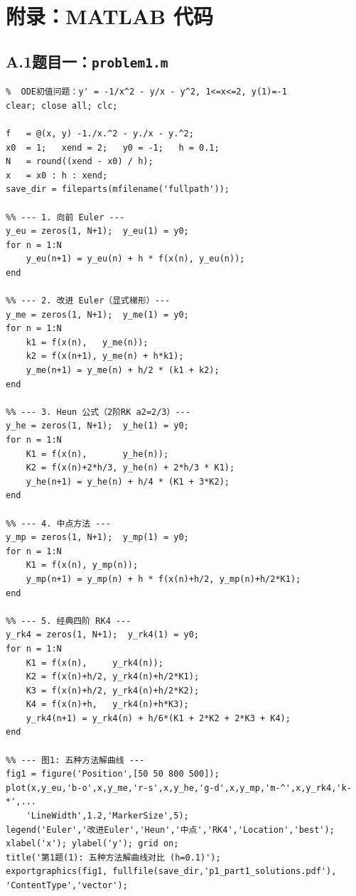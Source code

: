 \documentclass[UTF8,a4paper,11pt]{article}
\begin{document}
\section*{附录：MATLAB 代码}

\subsection*{A.1\quad 题目一：\texttt{problem1.m}}

\begin{lstlisting}[style=matlab, caption={\texttt{problem1.m}：五种单步方法与四阶 Adams PECE}]
%% problem1.m  第五章上机第1题
%  ODE初值问题：y' = -1/x^2 - y/x - y^2, 1<=x<=2, y(1)=-1
clear; close all; clc;

f   = @(x, y) -1./x.^2 - y./x - y.^2;
x0  = 1;   xend = 2;   y0 = -1;   h = 0.1;
N   = round((xend - x0) / h);
x   = x0 : h : xend;
save_dir = fileparts(mfilename('fullpath'));

%% --- 1. 向前 Euler ---
y_eu = zeros(1, N+1);  y_eu(1) = y0;
for n = 1:N
    y_eu(n+1) = y_eu(n) + h * f(x(n), y_eu(n));
end

%% --- 2. 改进 Euler（显式梯形）---
y_me = zeros(1, N+1);  y_me(1) = y0;
for n = 1:N
    k1 = f(x(n),   y_me(n));
    k2 = f(x(n+1), y_me(n) + h*k1);
    y_me(n+1) = y_me(n) + h/2 * (k1 + k2);
end

%% --- 3. Heun 公式（2阶RK a2=2/3）---
y_he = zeros(1, N+1);  y_he(1) = y0;
for n = 1:N
    K1 = f(x(n),       y_he(n));
    K2 = f(x(n)+2*h/3, y_he(n) + 2*h/3 * K1);
    y_he(n+1) = y_he(n) + h/4 * (K1 + 3*K2);
end

%% --- 4. 中点方法 ---
y_mp = zeros(1, N+1);  y_mp(1) = y0;
for n = 1:N
    K1 = f(x(n), y_mp(n));
    y_mp(n+1) = y_mp(n) + h * f(x(n)+h/2, y_mp(n)+h/2*K1);
end

%% --- 5. 经典四阶 RK4 ---
y_rk4 = zeros(1, N+1);  y_rk4(1) = y0;
for n = 1:N
    K1 = f(x(n),     y_rk4(n));
    K2 = f(x(n)+h/2, y_rk4(n)+h/2*K1);
    K3 = f(x(n)+h/2, y_rk4(n)+h/2*K2);
    K4 = f(x(n)+h,   y_rk4(n)+h*K3);
    y_rk4(n+1) = y_rk4(n) + h/6*(K1 + 2*K2 + 2*K3 + K4);
end

%% --- 图1: 五种方法解曲线 ---
fig1 = figure('Position',[50 50 800 500]);
plot(x,y_eu,'b-o',x,y_me,'r-s',x,y_he,'g-d',x,y_mp,'m-^',x,y_rk4,'k-*',...
    'LineWidth',1.2,'MarkerSize',5);
legend('Euler','改进Euler','Heun','中点','RK4','Location','best');
xlabel('x'); ylabel('y'); grid on;
title('第1题(1): 五种方法解曲线对比 (h=0.1)');
exportgraphics(fig1, fullfile(save_dir,'p1_part1_solutions.pdf'), 'ContentType','vector');


\end{lstlisting}
\end{document}
